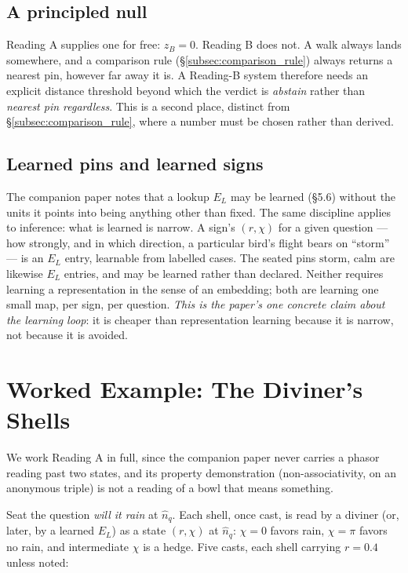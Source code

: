 \documentclass[12pt, a4paper]{article}
\begin{document}
\subsection{A principled null}
\label{subsec:the_null}
Reading A supplies one for free: $z_B=0$. Reading B does not. A walk
always lands somewhere, and a comparison rule (\S\ref{subsec:comparison_rule})
always returns a nearest pin, however far away it is. A Reading-B
system therefore needs an explicit distance threshold beyond which the
verdict is \emph{abstain} rather than \emph{nearest pin regardless}.
This is a second place, distinct from \S\ref{subsec:comparison_rule},
where a number must be chosen rather than derived.

\subsection{Learned pins and learned signs}
\label{subsec:learned_pins}
The companion paper notes that a lookup $E_L$ may be learned
(\S5.6) without the units it points into being anything other than
fixed. The same discipline applies to inference: what is learned is
narrow. A sign's $(r,\chi)$ for a given question --- how strongly, and
in which direction, a particular bird's flight bears on ``storm'' ---
is an $E_L$ entry, learnable from labelled cases. The seated pins
$\mathrm{storm}$, $\mathrm{calm}$ are likewise $E_L$ entries, and may
be learned rather than declared. Neither requires learning a
representation in the sense of an embedding; both are learning one
small map, per sign, per question. \emph{This is the paper's one
concrete claim about the learning loop}: it is cheaper than
representation learning because it is narrow, not because it is
avoided.

\section{Worked Example: The Diviner's Shells}
\label{sec:worked_example}

We work Reading A in full, since the companion paper never carries a
phasor reading past two states, and its property demonstration
(non-associativity, on an anonymous triple) is not a reading of a
bowl that means something.

Seat the question \emph{will it rain} at $\hat n_q$. Each shell, once
cast, is read by a diviner (or, later, by a learned $E_L$) as a state
$(r,\chi)$ at $\hat n_q$: $\chi=0$ favors rain, $\chi=\pi$ favors no
rain, and intermediate $\chi$ is a hedge. Five casts, each shell
carrying $r=0.4$ unless noted:
\end{document}
